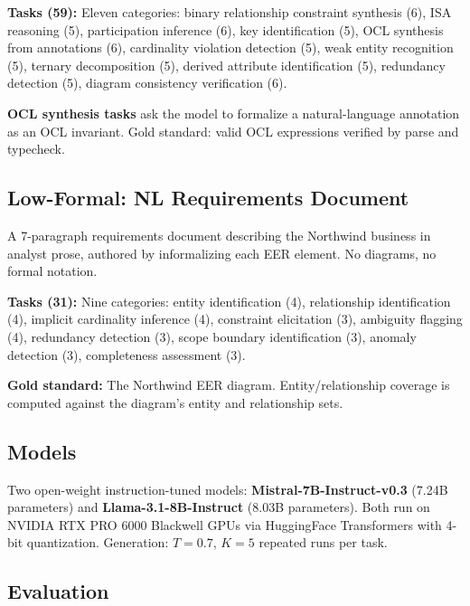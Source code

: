 \documentclass[runningheads]{llncs}
\begin{document}
\textbf{Tasks (59):} Eleven categories: binary relationship constraint synthesis (6), ISA reasoning (5), participation inference (6), key identification (5), OCL synthesis from annotations (6), cardinality violation detection (5), weak entity recognition (5), ternary decomposition (5), derived attribute identification (5), redundancy detection (5), diagram consistency verification (6).

\textbf{OCL synthesis tasks} ask the model to formalize a natural-language annotation as an OCL invariant. Gold standard: valid OCL expressions verified by parse and typecheck.

\subsection{Low-Formal: NL Requirements Document}

A 7-paragraph requirements document describing the Northwind business in analyst prose, authored by informalizing each EER element. No diagrams, no formal notation.

\textbf{Tasks (31):} Nine categories: entity identification (4), relationship identification (4), implicit cardinality inference (4), constraint elicitation (3), ambiguity flagging (4), redundancy detection (3), scope boundary identification (3), anomaly detection (3), completeness assessment (3).

\textbf{Gold standard:} The Northwind EER diagram. Entity/relationship coverage is computed against the diagram's entity and relationship sets.

\subsection{Models}

Two open-weight instruction-tuned models: \textbf{Mistral-7B-Instruct-v0.3} (7.24B parameters) and \textbf{Llama-3.1-8B-Instruct} (8.03B parameters). Both run on NVIDIA RTX PRO 6000 Blackwell GPUs via HuggingFace Transformers with 4-bit quantization. Generation: $T\!=\!0.7$, $K\!=\!5$ repeated runs per task.

\subsection{Evaluation}
\end{document}
